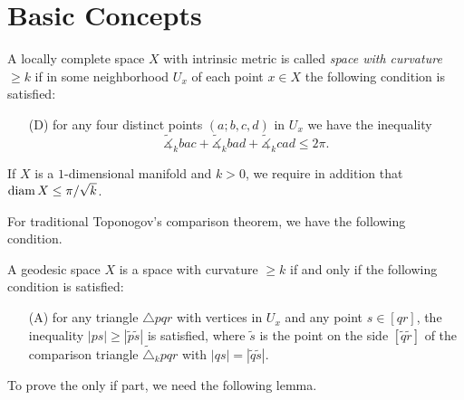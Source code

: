 \section{Basic Concepts}
\begin{defn}\label{defn:CBB D condition}
    A locally complete space $X$ with intrinsic metric is called \emph{space with curvature $\geq k$} if in some neighborhood $U_x$ of each point $x\in X$ the following condition is satisfied:
    \begin{itemize}
        \item[(D)] for any four distinct points $(a;b,c,d)$ in $U_x$ we have the inequality
        \[\tilde{\measuredangle}_kbac+\tilde{\measuredangle}_kbad+\tilde{\measuredangle}_kcad\leq 2\pi.\]
    \end{itemize}
    If $X$ is a $1$-dimensional manifold and $k>0$, we require in addition that $\operatorname{diam}{X}\leq\pi/\sqrt{k}$.
\end{defn}

For traditional Toponogov's comparison theorem, we have the following condition.
\begin{thm}\label{thm:CBB A condition}
    A geodesic space $X$ is a space with curvature $\geq k$ if and only if the following condition is satisfied:
    \begin{itemize}
        \item[\rm (A)] for any triangle $\triangle{pqr}$ with vertices in $U_x$ and any point $s\in[qr]$, the inequality $|ps|\geq|\tilde{p}\tilde{s}|$ is satisfied, where $\tilde{s}$ is the point on the side $[\tilde{q}\tilde{r}]$ of the comparison triangle $\tilde{\triangle}_kpqr$ with $|qs|=|\tilde{q}\tilde{s}|$.
    \end{itemize}
\end{thm}

To prove the only if part, we need the following lemma.

